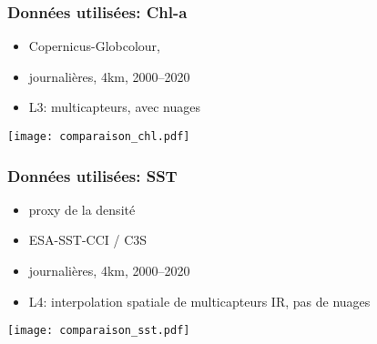 \documentclass[11pt, french, aspectratio=32]{beamer}
\begin{document}
\begin{frame}
  \frametitle{Données utilisées: Chl-a}

  \begin{block}{}
    \begin{itemize}
      \item Copernicus-Globcolour,
      \item journalières, 4km, 2000--2020
      \item L3: multicapteurs, avec nuages
    \end{itemize}
  \end{block}

  \vfill

  {\footnotesize\textit{\raisebox{2em}{22 avril 2007}}}
  \texttt{[image: comparaison\_chl.pdf]}%
\end{frame}



\begin{frame}
  \frametitle{Données utilisées: SST}

  \begin{block}{}
    \begin{itemize}
      \item proxy de la densité
      \item ESA-SST-CCI / C3S
      \item journalières, 4km, 2000--2020
      \item L4: interpolation spatiale de multicapteurs IR, pas de nuages
    \end{itemize}
  \end{block}

  \vfill

  {\footnotesize\textit{\raisebox{2em}{22 avril 2007}}}
  \texttt{[image: comparaison\_sst.pdf]}%

\end{frame}

\end{document}
